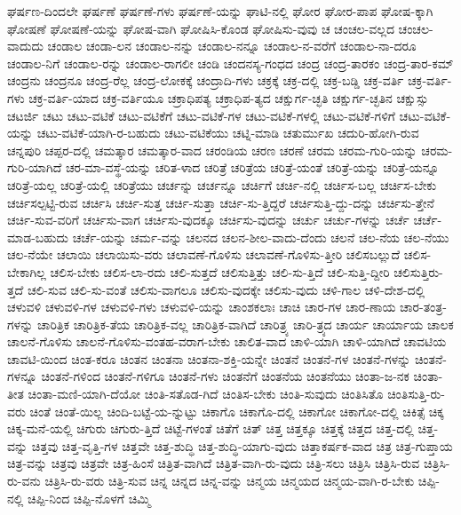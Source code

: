 {ಘರ್ಷಣ-ದಿಂದಲೇ
ಘರ್ಷಣೆ
ಘರ್ಷಣೆ-ಗಳು
ಘರ್ಷಣೆ-ಯನ್ನು
ಘಾಟಿ-ನಲ್ಲಿ
ಘೋರ
ಘೋರ-ಪಾಪ
ಘೋಷ-ಕ್ಕಾಗಿ
ಘೋಷಣೆ
ಘೋಷಣೆ-ಯನ್ನು
ಘೋಷ-ವಾಗಿ
ಘೋಷಿಸಿ-ಕೊಂಡ
ಘೋಷಿಸು-ವುವು
ಚ
ಚಂಚಲ-ವಲ್ಲದ
ಚಂಚಲ-ವಾದುದು
ಚಂಡಾಲ
ಚಂಡಾ-ಲನ
ಚಂಡಾಲ-ನನ್ನು
ಚಂಡಾಲ-ನನ್ನೂ
ಚಂಡಾಲ-ನ-ವರೆಗೆ
ಚಂಡಾಲ-ನಾ-ದರೂ
ಚಂಡಾಲ-ನಿಗೆ
ಚಂಡಾಲ-ರನ್ನು
ಚಂಡಾಲ-ರಾಗಲೀ
ಚಂಡಿ
ಚಂದನಸ್ಯ-ಗಂಧದ
ಚಂದ್ರ
ಚಂದ್ರ-ತಾರಕಂ
ಚಂದ್ರ-ತಾರ-ಕಮ್
ಚಂದ್ರನು
ಚಂದ್ರನೂ
ಚಂದ್ರ-ರೆಲ್ಲ
ಚಂದ್ರ-ಲೋಕಕ್ಕೆ
ಚಂದ್ರಾದಿ-ಗಳು
ಚಕ್ರಕ್ಕೆ
ಚಕ್ರ-ದಲ್ಲಿ
ಚಕ್ರ-ಬಡ್ಡಿ
ಚಕ್ರ-ವರ್ತಿ
ಚಕ್ರ-ವರ್ತಿ-ಗಳು
ಚಕ್ರ-ವರ್ತಿ-ಯಾದ
ಚಕ್ರ-ವರ್ತಿಯೂ
ಚಕ್ರಾಧಿಪತ್ಯ
ಚಕ್ರಾಧಿಪ-ತ್ಯದ
ಚಕ್ಷುರ್ಗ-ಚ್ಛತಿ
ಚಕ್ಷುರ್ಗ-ಚ್ಛತಿನ
ಚಕ್ಷುಸ್ಸು
ಚಟರ್ಜಿ
ಚಟು
ಚಟು-ವಟಿಕೆ
ಚಟು-ವಟಿಕೆಗೆ
ಚಟು-ವಟಿಕೆ-ಗಳ
ಚಟು-ವಟಿಕೆ-ಗಳಲ್ಲಿ
ಚಟು-ವಟಿಕೆ-ಗಳಿಗೆ
ಚಟು-ವಟಿಕೆ-ಯನ್ನು
ಚಟು-ವಟಿಕೆ-ಯಾಗಿ-ರ-ಬಹುದು
ಚಟು-ವಟಿಕೆಯು
ಚಟ್ನಿ-ಮಾಡಿ
ಚತುರ್ಮುಖ
ಚದುರಿ-ಹೋಗಿ-ರುವ
ಚನ್ನಪುರಿ
ಚಪ್ಪರ-ದಲ್ಲಿ
ಚಮತ್ಕಾರ
ಚಮತ್ಕಾರ-ವಾದ
ಚರಂಡಿಯ
ಚರಣ
ಚರಣೆ
ಚರಮ
ಚರಮ-ಗುರಿ-ಯನ್ನು
ಚರಮ-ಗುರಿ-ಯಾಗಿದೆ
ಚರ-ಮಾ-ವಸ್ಥೆ-ಯನ್ನು
ಚರಿತ-ಳಾದ
ಚರಿತ್ರೆ
ಚರಿತ್ರೆಯ
ಚರಿತ್ರೆ-ಯಂತೆ
ಚರಿತ್ರೆ-ಯನ್ನು
ಚರಿತ್ರೆ-ಯನ್ನೂ
ಚರಿತ್ರೆ-ಯಲ್ಲ
ಚರಿತ್ರೆ-ಯಲ್ಲಿ
ಚರಿತ್ರೆಯು
ಚರ್ಚನ್ನು
ಚರ್ಚನ್ನೂ
ಚರ್ಚಿಗೆ
ಚರ್ಚಿ-ನಲ್ಲಿ
ಚರ್ಚಿಸ-ಬಲ್ಲ
ಚರ್ಚಿಸ-ಬೇಕು
ಚರ್ಚಿಸಲ್ಪಟ್ಟಿ-ರುವ
ಚರ್ಚಿಸಿ
ಚರ್ಚಿ-ಸುತ್ತ
ಚರ್ಚಿ-ಸುತ್ತಾ
ಚರ್ಚಿ-ಸು-ತ್ತಿದ್ದರೆ
ಚರ್ಚಿಸುತ್ತಿ-ದ್ದು-ದನ್ನು
ಚರ್ಚಿಸು-ತ್ತೇನೆ
ಚರ್ಚಿ-ಸುವ-ವರಿಗೆ
ಚರ್ಚಿಸು-ವಾಗ
ಚರ್ಚಿಸು-ವುದಕ್ಕೂ
ಚರ್ಚಿಸು-ವುದನ್ನು
ಚರ್ಚು
ಚರ್ಚು-ಗಳನ್ನು
ಚರ್ಚೆ
ಚರ್ಚೆ-ಮಾಡ-ಬಹುದು
ಚರ್ಚೆ-ಯನ್ನು
ಚರ್ಮ-ವನ್ನು
ಚಲನದ
ಚಲನ-ಶೀಲ-ವಾದು-ದೆಂದು
ಚಲನೆ
ಚಲ-ನೆಯ
ಚಲ-ನೆಯು
ಚಲ-ನೆಯೇ
ಚಲಾಯಿ
ಚಲಾಯಿಸು-ವರು
ಚಲಾವಣೆ-ಗೊಳಿಸು
ಚಲಾವಣೆ-ಗೊಳಿಸು-ತ್ತೀರಿ
ಚಲಿಸಬಲ್ಲುದೆ
ಚಲಿಸ-ಬೇಕಾಗಿಲ್ಲ
ಚಲಿಸ-ಬೇಕು
ಚಲಿಸ-ಲಾ-ರದು
ಚಲಿ-ಸುತ್ತದೆ
ಚಲಿಸುತ್ತಿತ್ತು
ಚಲಿ-ಸು-ತ್ತಿದೆ
ಚಲಿ-ಸುತ್ತಿ-ದ್ದೀರಿ
ಚಲಿಸುತ್ತಿರು-ತ್ತದೆ
ಚಲಿ-ಸುವ
ಚಲಿ-ಸು-ವಂತೆ
ಚಲಿಸು-ವಾಗಲೂ
ಚಲಿಸು-ವುದಕ್ಕೇ
ಚಲಿಸು-ವುದು
ಚಳಿ-ಗಾಲ
ಚಳಿ-ದೇಶ-ದಲ್ಲಿ
ಚಳುವಳಿ
ಚಳುವಳಿ-ಗಳ
ಚಳುವಳಿ-ಗಳು
ಚಳುವಳಿ-ಯನ್ನು
ಚಾಂಶಕಲಾಃ
ಚಾಚಿ
ಚಾರ-ಗಳ
ಚಾರ-ಣಾಯ
ಚಾರ-ತಂತ್ರ-ಗಳನ್ನು
ಚಾರಿತ್ರಿಕ
ಚಾರಿತ್ರಿಕ-ತೆಯ
ಚಾರಿತ್ರಿಕ-ವಲ್ಲ
ಚಾರಿತ್ರಿಕ-ವಾಗಿದೆ
ಚಾರಿತ್ರ್ಯ
ಚಾರಿ-ತ್ರ್ಯದ
ಚಾರ್ಯ
ಚಾರ್ಯಾಯ
ಚಾಲಕ
ಚಾಲನೆ-ಗೊಳಿಸು
ಚಾಲನೆ-ಗೊಳಿಸು-ವಂತಹ-ವರಾಗ-ಬೇಕು
ಚಾಲಿತ-ವಾದ
ಚಾಳಿ-ಯಾಗಿ
ಚಾಳಿ-ಯಾಗಿದೆ
ಚಾವಟಿಯ
ಚಾವಟಿ-ಯಿಂದ
ಚಿಂತ-ಕರೂ
ಚಿಂತನ
ಚಿಂತನಾ
ಚಿಂತನಾ-ಶಕ್ತಿ-ಯನ್ನೇ
ಚಿಂತನೆ
ಚಿಂತನೆ-ಗಳ
ಚಿಂತನೆ-ಗಳನ್ನು
ಚಿಂತನೆ-ಗಳನ್ನೂ
ಚಿಂತನೆ-ಗಳಿಂದ
ಚಿಂತನೆ-ಗಳಿಗೂ
ಚಿಂತನೆ-ಗಳು
ಚಿಂತನೆಗೆ
ಚಿಂತನೆಯ
ಚಿಂತನೆಯು
ಚಿಂತಾ-ಜ-ನಕ
ಚಿಂತಾ-ತೀತ
ಚಿಂತಾ-ಮಣಿ-ಯಾಗಿ-ದೆಯೋ
ಚಿಂತಿ-ಸತೊಡ-ಗಿದೆ
ಚಿಂತಿಸ-ಬೇಕು
ಚಿಂತಿ-ಸುವುದು
ಚಿಂತಿಸಿತೊ
ಚಿಂತಿಸುತ್ತಿ-ರು-ವರು
ಚಿಂತೆ
ಚಿಂತೆ-ಯಿಲ್ಲ
ಚಿಂದಿ-ಬಟ್ಟೆ-ಯ-ನ್ನುಟ್ಟು
ಚಿಕಾಗೊ
ಚಿಕಾಗೊ-ದಲ್ಲಿ
ಚಿಕಾಗೋ
ಚಿಕಾಗೋ-ದಲ್ಲಿ
ಚಿಕಿತ್ಸೆ
ಚಿಕ್ಕ
ಚಿಕ್ಕ-ಮನೆ-ಯಲ್ಲಿ
ಚಿಗುರು
ಚಿಗುರು-ತ್ತಿದೆ
ಚಿಟ್ಟೆ-ಗಳಂತೆ
ಚಿತೆಗೆ
ಚಿತ್
ಚಿತ್ತ
ಚಿತ್ತಕ್ಕೂ
ಚಿತ್ತಕ್ಕೆ
ಚಿತ್ತದ
ಚಿತ್ತ-ದಲ್ಲಿ
ಚಿತ್ತ-ವನ್ನು
ಚಿತ್ತವು
ಚಿತ್ತ-ವೃತ್ತಿ-ಗಳ
ಚಿತ್ತವೇ
ಚಿತ್ತ-ಶುದ್ಧಿ
ಚಿತ್ತ-ಶುದ್ಧಿ-ಯಾಗು-ವುದು
ಚಿತ್ತಾಕರ್ಷಕ-ವಾದ
ಚಿತ್ರ
ಚಿತ್ರ-ಗುಪ್ತಾಯ
ಚಿತ್ರ-ವನ್ನು
ಚಿತ್ರವು
ಚಿತ್ರವೇ
ಚಿತ್ರ-ಹಿಂಸೆ
ಚಿತ್ರಿತ-ವಾಗಿದೆ
ಚಿತ್ರಿತ-ವಾಗಿ-ರು-ವುದು
ಚಿತ್ರಿ-ಸಲು
ಚಿತ್ರಿಸಿ
ಚಿತ್ರಿಸಿ-ರುವ
ಚಿತ್ರಿಸಿ-ರು-ವನು
ಚಿತ್ರಿಸಿ-ರು-ವರು
ಚಿತ್ರಿ-ಸುವ
ಚಿನ್ನ
ಚಿನ್ನದ
ಚಿನ್ನ-ವನ್ನು
ಚಿನ್ಮಯ
ಚಿನ್ಮಯದ
ಚಿನ್ಮಯ-ವಾಗಿ-ರ-ಬೇಕು
ಚಿಪ್ಪಿ-ನಲ್ಲಿ
ಚಿಪ್ಪಿ-ನಿಂದ
ಚಿಪ್ಪಿ-ನೊಳಗೆ
ಚಿಮ್ಮಿ
}
